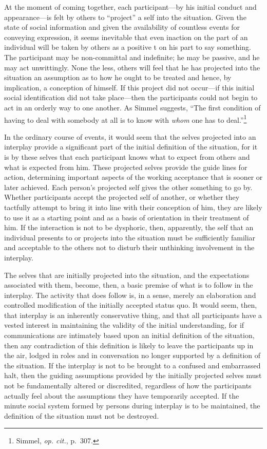 \documentclass[openany,nobib]{tufte-book}
\begin{document}
At the moment of coming together, each participant---by his initial
conduct and appearance---is felt by others to ``project'' a self into
the situation. Given the state of social information and given the
availability of countless events for conveying expression, it seems
inevitable that even inaction on the part of an individual will be taken
by others as a positive t on his part to say something. The participant
may be non-committal and indefinite; he may be passive, and he may act
unwittingly. None the less, others will feel that he has projected into
the situation an assumption as to how he ought to be treated and hence,
by implication, a conception of himself. If this project did not
occur---if this initial social identification did not take place---then
the participants could not begin to act in an orderly way to one
another. As Simmel suggests, ``The first condition of having to deal
with somebody at all is to know with \emph{whom} one has to
deal.''\footnote{Simmel, \emph{op. cit.}, p.~307.}

In the ordinary course of events, it would seem that the selves
projected into an interplay provide a significant part of the initial
definition of the situation, for it is by these selves that each
participant knows what to expect from others and what is expected from
him. These projected selves provide the guide lines for action,
determining important aspects of the working acceptance that is sooner
or later achieved. Each person's projected self gives the other
something to go by. Whether participants accept the projected self of
another, or whether they tactfully attempt to bring it into line with
their conception of him, they are likely to use it as a starting point
and as a basis of orientation in their treatment of him. If the
interaction is not to be dysphoric, then, apparently, the self that an
individual presents to or projects into the situation must be
sufficiently familiar and acceptable to the others not to disturb their
unthinking involvement in the interplay.

The selves that are initially projected into the situation, and the
expectations associated with them, become, then, a basic premise of what
is to follow in the interplay. The activity that does follow is, in a
sense, merely an elaboration and controlled modification of the
initially accepted status quo. It would seem, then, that interplay is an
inherently conservative thing, and that all participants have a vested
interest in maintaining the validity of the initial understanding, for
if communications are intimately based upon an initial definition of the
situation, then any contradiction of this definition is likely to leave
the participants up in the air, lodged in roles and in conversation no
longer supported by a definition of the situation. If the interplay is
not to be brought to a confused and embarrassed halt, then the guiding
assumptions provided by the initially projected selves must not be
fundamentally altered or discredited, regardless of how the participants
actually feel about the assumptions they have temporarily accepted. If
the minute social system formed by persons during interplay is to be
maintained, the definition of the situation must not be destroyed.
\end{document}
